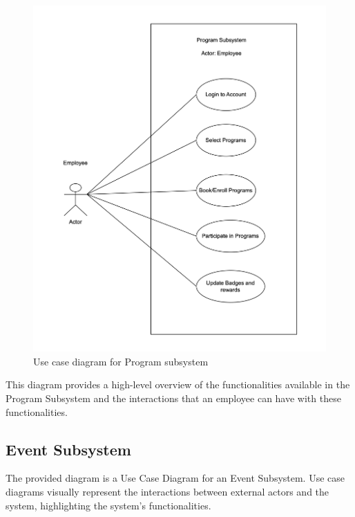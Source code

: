 \begin{figure}[h!t]
    \centering
    \includegraphics[width=\textwidth]{images/ucProgram.png}
    \caption{Use case diagram for Program subsystem}
    \label{fig:ucProgram}
\end{figure}

\FloatBarrier

This diagram provides a high-level overview of the functionalities available in the Program Subsystem and the interactions that an employee can have with these functionalities. 

\subsection{Event Subsystem}

The provided diagram is a Use Case Diagram for an Event Subsystem. Use case diagrams visually represent the interactions between external actors and the system, highlighting the system's functionalities. 

